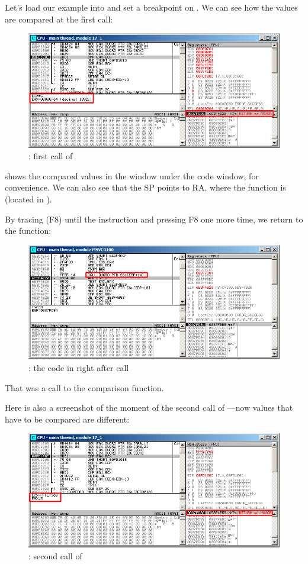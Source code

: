 ﻿\clearpage
{}
\myindex{\olly}

Let's load our example into \olly and set a breakpoint on \comp.
We can see how the values are compared at the first \comp call:

\begin{figure}[H]
\centering
\includegraphics[scale=\FigScale]{patterns/18_pointers_to_functions/olly1.png}
\caption{\olly: first call of \comp}
\label{fig:qsort_olly1}
\end{figure}

\olly shows the compared values in the window under the code window, for convenience.
We can also see that the \ac{SP} points to \ac{RA}, where the \qsort function is (located in ).

\clearpage
By tracing (F8) until the  instruction and pressing F8 one more time, we return to the \qsort function:

\begin{figure}[H]
\centering
\includegraphics[scale=\FigScale]{patterns/18_pointers_to_functions/olly2.png}
\caption{\olly: the code in \qsort right after \comp call}
\label{fig:qsort_olly2}
\end{figure}

That was a call to the comparison function.

\clearpage
Here is also a screenshot of the moment of the second call of \comp{}---now values that have to be compared are different:

\begin{figure}[H]
\centering
\includegraphics[scale=\FigScale]{patterns/18_pointers_to_functions/olly3.png}
\caption{\olly: second call of \comp}
\label{fig:qsort_olly3}
\end{figure}
